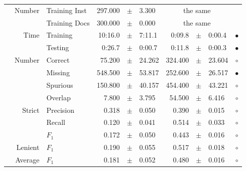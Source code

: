 \begin{longtable}{|r|r|l||rcl|rcl|c|}
\cline{2-10} & \multirow{2}{*}{    Number} &   Training Inst &     297.000 &  $\pm$  &       3.300 &    \multicolumn{3}{c|}{the same}         &  \\
\cline{3-10} &                             &   Training Docs &     300.000 &  $\pm$  &       0.000 &    \multicolumn{3}{c|}{the same}         &  \\
\cline{2-10} & \multirow{2}{*}{      Time} &        Training &     10:16.0 &  $\pm$  &      7:11.1 &      0:09.8 &  $\pm$  &      0:00.4 & $\bullet$ \\
\cline{3-10} &                             &         Testing &      0:26.7 &  $\pm$  &      0:00.7 &      0:11.8 &  $\pm$  &      0:00.3 & $\bullet$ \\
\hline
\pagebreak
\hline
\hline
\multirow{11}{*}{\begin{sideways}purchabr\end{sideways} }
             & \multirow{4}{*}{    Number} &         Correct &      75.200 &  $\pm$  &      24.262 &     324.400 &  $\pm$  &      23.604 & $\circ$ \\
\cline{3-10} &                             &         Missing &     548.500 &  $\pm$  &      53.817 &     252.600 &  $\pm$  &      26.517 & $\bullet$ \\
\cline{3-10} &                             &        Spurious &     150.800 &  $\pm$  &      40.157 &     454.400 &  $\pm$  &      43.221 & $\circ$ \\
\cline{3-10} &                             &         Overlap &       7.800 &  $\pm$  &       3.795 &      54.500 &  $\pm$  &       6.416 & $\circ$ \\
\cline{2-10} & \multirow{3}{*}{    Strict} &       Precision &       0.318 &  $\pm$  &       0.050 &       0.390 &  $\pm$  &       0.015 & $\circ$ \\
\cline{3-10} &                             &          Recall &       0.120 &  $\pm$  &       0.041 &       0.514 &  $\pm$  &       0.033 & $\circ$ \\
\cline{3-10} &                             &           $F_1$ &       0.172 &  $\pm$  &       0.050 &       0.443 &  $\pm$  &       0.016 & $\circ$ \\
\cline{2-10} &                     Lenient &           $F_1$ &       0.190 &  $\pm$  &       0.055 &       0.517 &  $\pm$  &       0.018 & $\circ$ \\
\cline{2-10} &                     Average &           $F_1$ &       0.181 &  $\pm$  &       0.052 &       0.480 &  $\pm$  &       0.016 & $\circ$ \\

\end{longtable}
